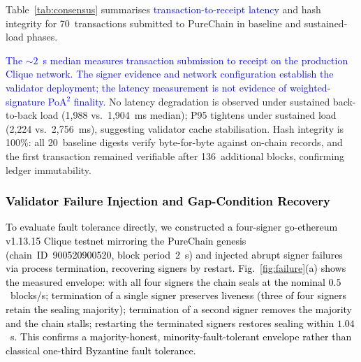 \documentclass[conference]{IEEEtran}
\newcommand{\rev}[2]{\textcolor{blue}{#2}}
\begin{document}
Table~\ref{tab:consensus} summarises \rev{R2.4}{transaction-to-receipt latency} and
hash integrity for 70~transactions submitted to PureChain
in baseline and sustained-load phases.

\begin{table}[!t]
\centering
\caption{\rev{R1.2, R2.4}{Production PureChain (Clique) transaction-to-receipt latency (ms)} and hash
integrity. \textcolor{black}{Active signer set recovered from
block-seal attribution; signer rotation observed (3 of 4 signers in recent blocks).}
Blocks~1{,}012{,}544--1{,}012{,}680.}
\label{tab:consensus}
\end{table}

\rev{R2.4}{The ${\sim}2$~s median measures transaction submission
to receipt on the production Clique network. The signer evidence
and network configuration establish the validator deployment;
the latency measurement is not evidence of weighted-signature
PoA$^2$ finality.}
No latency degradation is observed under sustained
back-to-back load (1{,}988 vs.\ 1{,}904~ms median);
P95 tightens under sustained load (2{,}224 vs.\
2{,}756~ms), suggesting validator cache stabilisation.
Hash integrity is 100\%: all 20~baseline digests verify
byte-for-byte against on-chain records, and the first
transaction remained verifiable after 136~additional
blocks, confirming ledger immutability.

\textcolor{black}{\subsubsection{Validator Failure Injection and Gap-Condition Recovery}
To evaluate fault tolerance directly, we constructed a
four-signer go-ethereum v1.13.15 Clique testnet mirroring
the PureChain genesis (chain~ID~900520900520, block
period~2~s) and injected abrupt signer failures via
process termination, recovering signers by restart.
Fig.~\ref{fig:failure}(a) shows the measured envelope:
with all four signers the chain seals at the nominal
$0.5$~blocks/s; termination of a single signer preserves
liveness (three of four signers retain the sealing
majority); termination of a second signer removes the
majority and the chain stalls; restarting the terminated
signers restores sealing within $1.04$~s. This confirms a
majority-honest, minority-fault-tolerant envelope
rather than classical one-third Byzantine fault tolerance.}
\end{document}
